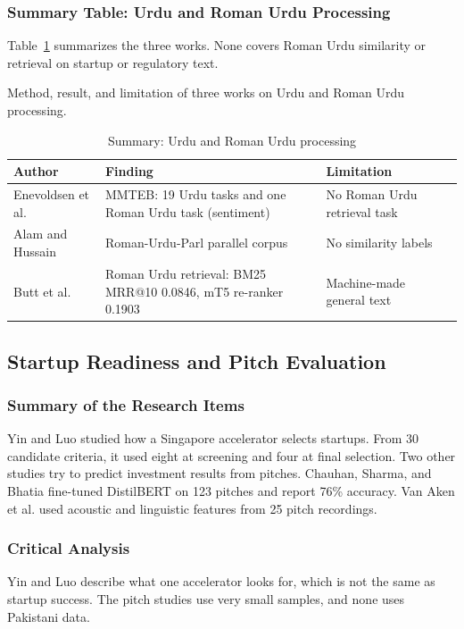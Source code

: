 \documentclass{FastFyp}
\makeatletter
\newcommand{\capdesc}[1]{%
  \par\nobreak
  \begingroup
  \setstretch{1}%
  \ifdefstring{\@captype}{figure}%
    {\vspace{0.2\baselineskip}}%
    {\vspace{-0.8\baselineskip}}%
  {\centering\normalfont\itshape\small
   \begin{minipage}{0.92\textwidth}\centering #1\end{minipage}\par}%
  \endgroup
  \vspace{0.4\baselineskip}%
}
\makeatother
\begin{document}
\subsubsection{Summary Table: Urdu and Roman Urdu Processing}
Table~\ref{tab:lr-urdu} summarizes the three works. None covers Roman Urdu similarity or retrieval on startup or regulatory text.
\begin{table}[!ht]
\centering
\caption{Summary: Urdu and Roman Urdu processing}
\capdesc{Method, result, and limitation of three works on Urdu and Roman Urdu processing.}
\begin{tabular}{|p{3.0cm}|p{4.0cm}|p{2.8cm}|p{4.0cm}|}
\hline
\textbf{Author} & \textbf{Finding} & \textbf{Limitation} \\
\hline
Enevoldsen et al. \cite{ref:enevoldsen2025mmteb} & MMTEB: 19 Urdu tasks and one Roman Urdu task (sentiment) & No Roman Urdu retrieval task \\
\hline
Alam and Hussain \cite{ref:alam2022romanurduparl} & Roman-Urdu-Parl parallel corpus & No similarity labels \\
\hline
Butt et al. \cite{ref:butt2025romanurduir} & Roman Urdu retrieval: BM25 MRR@10 0.0846, mT5 re-ranker 0.1903 & Machine-made general text \\
\hline
\end{tabular}
\label{tab:lr-urdu}
\end{table}

\subsection{Startup Readiness and Pitch Evaluation}

\subsubsection{Summary of the Research Items}
Yin and Luo \cite{ref:yin2018accelerator} studied how a Singapore accelerator selects startups. From 30 candidate criteria, it used eight at screening and four at final selection. Two other studies try to predict investment results from pitches. Chauhan, Sharma, and Bhatia \cite{ref:chauhan2024pitch} fine-tuned DistilBERT on 123 pitches and report 76\% accuracy. Van Aken et al. \cite{ref:vanaken2023} used acoustic and linguistic features from 25 pitch recordings.

\subsubsection{Critical Analysis}
Yin and Luo describe what one accelerator looks for, which is not the same as startup success. The pitch studies use very small samples, and none uses Pakistani data.
\end{document}
